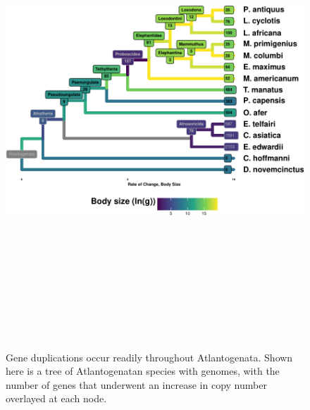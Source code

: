 \documentclass[]{elsarticle} %
\begin{document}
\begin{figure}

\includegraphics[width=6in,height=7in]{paper_PLOS_draft_files/figure-latex/Figure-GeneDup-Cladogram-1} \hfill{}

\caption{Gene duplications occur readily throughout Atlantogenata. Shown here is a tree of Atlantogenatan species with genomes, with the number of genes that underwent an increase in copy number overlayed at each node.}\label{fig:Figure-GeneDup-Cladogram}
\end{figure}
\end{document}

